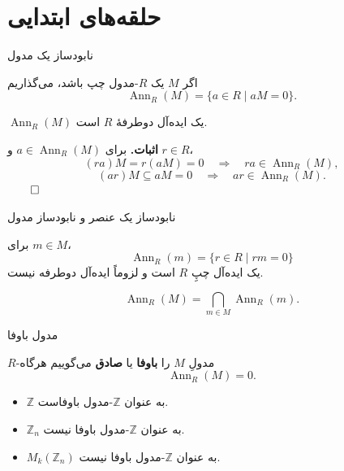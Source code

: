 \section{حلقه‌های ابتدایی}

\begin{frame}[t]{نابودساز یک مدول}
    \label{lec14:module-annihilator}
    \begin{definition}
        اگر \(M\) یک \(R\)-مدول چپ باشد، می‌گذاریم
        \[
            \operatorname{Ann}_R(M)=\{a\in R\mid aM=0\}.
        \]
    \end{definition}
    \begin{lemma}
        \(\operatorname{Ann}_R(M)\) یک ایده‌آل دوطرفهٔ \(R\) است.
    \end{lemma}
    \textbf{اثبات.} برای \(a\in\operatorname{Ann}_R(M)\) و \(r\in R\)،
    \[
        (ra)M=r(aM)=0\quad\Longrightarrow\quad ra\in\operatorname{Ann}_R(M),
    \]
    \[
        (ar)M\subseteq aM=0\quad\Longrightarrow\quad ar\in\operatorname{Ann}_R(M).
    \]
    \hfill\(\qed\)
\end{frame}

\begin{frame}[t]{نابودساز یک عنصر و نابودساز مدول}
    \label{lec14:element-annihilator}
    \begin{remark}[یادآوری]
        برای \(m\in M\)،
        \[
            \operatorname{Ann}_R(m)=\{r\in R\mid rm=0\}
        \]
        یک ایده‌آل چپِ \(R\) است و لزوماً ایده‌آل دوطرفه نیست.
    \end{remark}
    \begin{remark}
        \[
            \operatorname{Ann}_R(M)=\bigcap_{m\in M}\operatorname{Ann}_R(m).
        \]
    \end{remark}
\end{frame}

\begin{frame}[t]{مدول باوفا}
    \label{lec14:faithful-module}
    \begin{definition}
        \(R\)-مدولِ \(M\) را \textbf{باوفا} یا \textbf{صادق}  می‌گوییم هرگاه
        \[
            \operatorname{Ann}_R(M)=0.
        \]
    \end{definition}
    \begin{example}
        \begin{itemize}
            \item \(\mathbb Z\) به عنوان \(\mathbb Z\)-مدول باوفاست.
            \item \(\mathbb Z_n\) به عنوان \(\mathbb Z\)-مدول باوفا نیست.
            \item \(M_k(\mathbb Z_n)\) به عنوان \(\mathbb Z\)-مدول باوفا نیست.
        \end{itemize}
    \end{example}
\end{frame}


